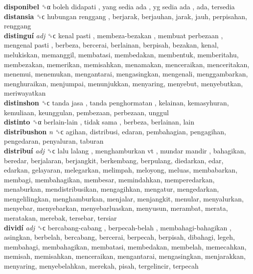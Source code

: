 \textbf{disponibel} ␝α   boleh didapati ,  yang sedia ada ,  yg sedia ada , ada, tersedia  \\
\textbf{distansia} ␝ϲ   hubungan renggang , berjarak, berjauhan, jarak, jauh, perpisahan, renggang  \\
\textbf{distinguí} \emph{adj}  ␝ϲ   kenal pasti ,  membeza-bezakan ,  membuat perbezaan ,  mengenal pasti , berbeza, bercerai, berlainan, berpisah, bezakan, kenal, melukiskan, memanggil, membatasi, membedakan, membentuk, memberitahu, membezakan, memerikan, memisahkan, menamakan, menceraikan, menceritakan, menemui, menemukan, mengantarai, mengasingkan, mengenali, menggambarkan, menghuraikan, menjumpai, menunjukkan, menyaring, menyebut, menyebutkan, meriwayatkan  \\
\textbf{distinshon} ␝ϲ   tanda jasa ,  tanda penghormatan , kelainan, kemasyhuran, kemuliaan, keunggulan, pembezaan, perbezaan, unggul  \\
\textbf{distinto} ␝α   berlain-lain ,  tidak sama , berbeza, berlainan, lain  \\
\textbf{distribushon} \emph{n}  ␝ϲ  agihan, distribusi, edaran, pembahagian, pengagihan, pengedaran, penyaluran, taburan  \\
\textbf{distribuí} \emph{adj}  ␝ϲ   lalu lalang ,  menghamburkan vt ,  mundar mandir , bahagikan, beredar, berjalaran, berjangkit, berkembang, berpulang, diedarkan, edar, edarkan, gelayaran, melegarkan, melimpah, meloyong, meluas, membabarkan, membagi, membahagikan, membesar, memindahkan, memperedarkan, menaburkan, mendistribusikan, mengagihkan, mengatur, mengedarkan, mengelilingkan, menghamburkan, menjalar, menjangkit, menular, menyalurkan, menyebar, menyebarkan, menyebarluaskan, menyusun, merambat, merata, meratakan, merebak, tersebar, tersiar  \\
\textbf{dividí} \emph{adj}  ␝ϲ   bercabang-cabang ,  berpecah-belah ,  membahagi-bahagikan , asingkan, berbelah, bercabang, bercerai, berpecah, berpisah, dibahagi, legeh, membahagi, membahagikan, membatasi, membedakan, membelah, memecahkan, memisah, memisahkan, menceraikan, mengantarai, mengasingkan, menjarakkan, menyaring, menyebelahkan, merekah, pisah, tergelincir, terpecah  \\
